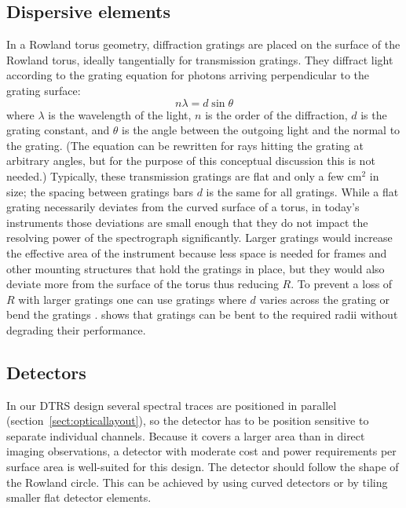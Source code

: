 \documentclass[linenumbers]{aastex631}
\begin{document}
\subsection{Dispersive elements}
In a Rowland torus geometry, diffraction gratings are placed on the surface of the Rowland torus, ideally tangentially for transmission gratings. They diffract light according to the grating equation for photons arriving perpendicular to the grating surface:
\begin{equation}
n \lambda = d \sin \theta \label{eqn:diffraction}
\end{equation}
where $\lambda$ is the wavelength of the light, $n$ is the order of the diffraction, $d$ is the grating constant, and $\theta$ is the angle between the outgoing light and the normal to the grating. (The equation can be rewritten for rays hitting the grating at arbitrary angles, but for the purpose of this conceptual discussion this is not needed.)
Typically, these transmission gratings are flat and only a few cm$^2$ in size; the spacing between gratings bars $d$ is the same for all gratings.
While a flat grating necessarily deviates from the curved surface of a torus, in today's instruments those deviations are small enough that they do not impact the resolving power of the spectrograph significantly. Larger gratings would increase the effective area of the instrument because less space is needed for frames and other mounting structures that hold the gratings in place, but they would also deviate more from the surface of the torus thus reducing $R$.
To prevent a loss of $R$ with larger gratings one can use gratings where $d$ varies across the grating \citep{1986SPIE..560...96H,2020SPIE11444E..88G} or bend the gratings \citep{2020SPIE11444E..88G}. \citet{2019SPIE11118E..11G} shows that gratings can be bent to the required radii without degrading their performance.


\subsection{Detectors}
In our DTRS design several spectral traces are positioned in parallel (section~\ref{sect:opticallayout}), so the detector has to be position sensitive to separate individual channels.  Because it covers a larger area than in direct imaging observations, a detector with moderate cost and power requirements per surface area is well-suited for this design. The detector should follow the shape of the Rowland circle. This can be achieved by using curved detectors or by tiling smaller flat detector elements. %
\end{document}
